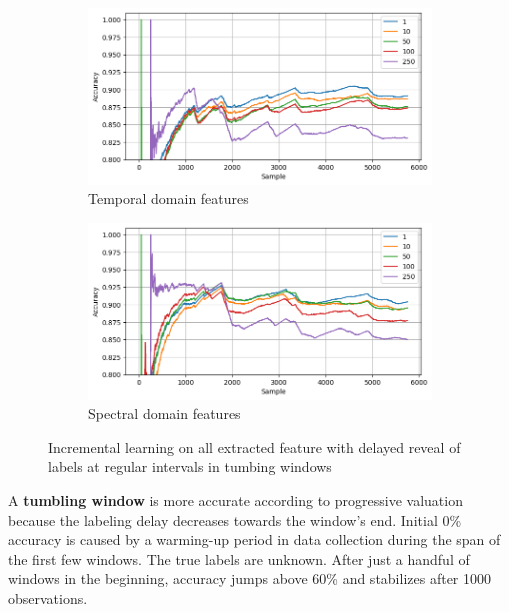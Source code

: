 \begin{figure}[ht]
    \centering
    \begin{subfigure}[b]{0.49\textwidth}
        \includegraphics[width=\textwidth]{assets/design/gradual-learning-delay-temporal-domain-fault.png}
        \caption{Temporal domain features}
    \end{subfigure}
    \hfill
    \begin{subfigure}[b]{0.49\textwidth}
        \includegraphics[width=\textwidth]{assets/design/gradual-learning-delay-spectral-domain-fault.png}
        \caption{Spectral domain features}
    \end{subfigure}
    \caption{Incremental learning on all extracted feature with delayed reveal of labels at regular intervals in tumbing windows}
    \label{fig:design:online-fault-delay-tumbling}
\end{figure}

A \textbf{tumbling window} is more accurate according to progressive valuation because the labeling delay decreases towards the window's end. Initial 0\% accuracy is caused by a warming-up period in data collection during the span of the first few windows. The true labels are unknown. After just a handful of windows in the beginning, accuracy jumps above 60\% and stabilizes after 1000 observations.

